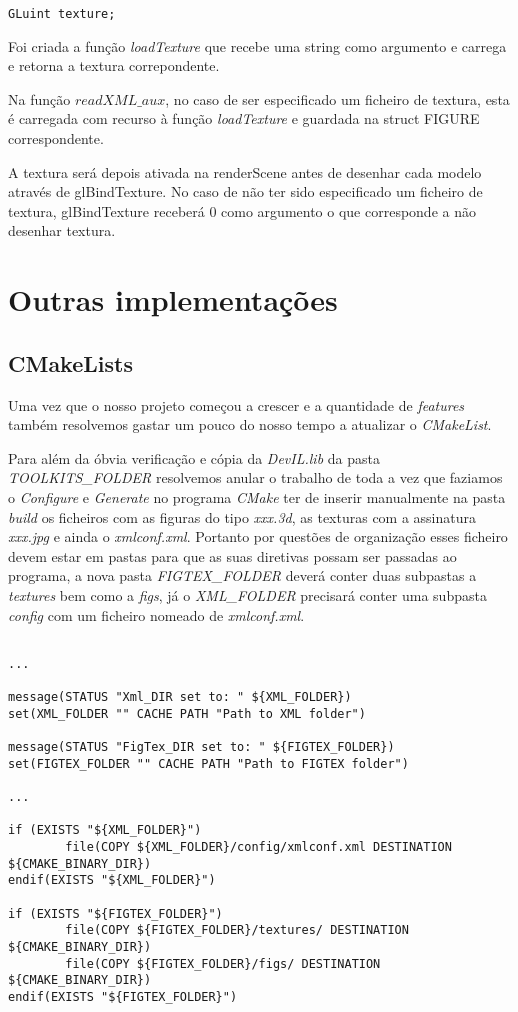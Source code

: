 \documentclass[11pt,a4paper]{report}
\begin{document}
\begin{lstlisting}[style = code]
GLuint texture;
\end{lstlisting}

Foi criada a função \emph{loadTexture} que recebe uma string como argumento e carrega e retorna a textura correpondente.

Na função {$readXML\_aux$}, no caso de ser especificado um ficheiro de textura, esta é carregada com recurso à função \emph{loadTexture} e guardada na struct FIGURE correspondente.

A textura será depois ativada na renderScene antes de desenhar cada modelo através de glBindTexture. No caso de não ter sido especificado um ficheiro de textura, glBindTexture receberá 0 como argumento o que corresponde a não desenhar textura.

\section{Outras implementações}

\subsection{CMakeLists}

Uma vez que o nosso projeto começou a crescer e a quantidade de \emph{features} também resolvemos gastar um pouco do nosso tempo a atualizar o \emph{CMakeList}. 

Para além da óbvia verificação e cópia da \emph{DevIL.lib} da pasta \emph{TOOLKITS\_FOLDER} resolvemos anular o trabalho de toda a vez que faziamos o \emph{Configure} e \emph{Generate} no programa \emph{CMake} ter de inserir manualmente na pasta \emph{build} os ficheiros com as figuras do tipo \emph{xxx.3d}, as texturas com a assinatura \emph{xxx.jpg} e ainda o \emph{xmlconf.xml}. Portanto por questões de organização esses ficheiro devem estar em pastas para que as suas diretivas possam ser passadas ao programa, a nova pasta \emph{FIGTEX\_FOLDER} deverá conter duas subpastas a \emph{textures} bem como a \emph{figs}, já o \emph{XML\_FOLDER} precisará conter uma subpasta \emph{config} com um ficheiro nomeado de \emph{xmlconf.xml}.
\begin{lstlisting}[style = cmake]

...

message(STATUS "Xml_DIR set to: " ${XML_FOLDER})
set(XML_FOLDER "" CACHE PATH "Path to XML folder")

message(STATUS "FigTex_DIR set to: " ${FIGTEX_FOLDER})
set(FIGTEX_FOLDER "" CACHE PATH "Path to FIGTEX folder")

...

if (EXISTS "${XML_FOLDER}")
		file(COPY ${XML_FOLDER}/config/xmlconf.xml DESTINATION ${CMAKE_BINARY_DIR})
endif(EXISTS "${XML_FOLDER}")

if (EXISTS "${FIGTEX_FOLDER}")
	    file(COPY ${FIGTEX_FOLDER}/textures/ DESTINATION ${CMAKE_BINARY_DIR})
	    file(COPY ${FIGTEX_FOLDER}/figs/ DESTINATION ${CMAKE_BINARY_DIR})
endif(EXISTS "${FIGTEX_FOLDER}")

\end{lstlisting}
\end{document}
